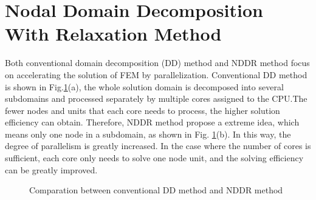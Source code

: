 \documentclass[journal,transmag]{IEEEtran}
\begin{document}
\section{Nodal Domain Decomposition With Relaxation Method}
Both conventional domain decomposition (DD) method and NDDR method focus on accelerating the solution of FEM by parallelization. Conventional DD method is shown in Fig.\ref{nddr}(a), the whole solution domain is decomposed into several subdomains and processed separately by multiple cores assigned to the CPU.The fewer nodes and units that each core needs to process, the higher solution efficiency can obtain. Therefore, NDDR method propose a extreme idea, which means only one node in a subdomain, as shown in Fig. \ref{nddr}(b). In this way, the degree of parallelism is greatly increased. In the case where the number of cores is sufficient, each core only needs to solve one node unit, and the solving efficiency can be greatly improved.

\begin{figure}
	\centering
	\caption{Comparation between conventional DD method and NDDR method}
	\label{nddr}
\end{figure}
\end{document}
